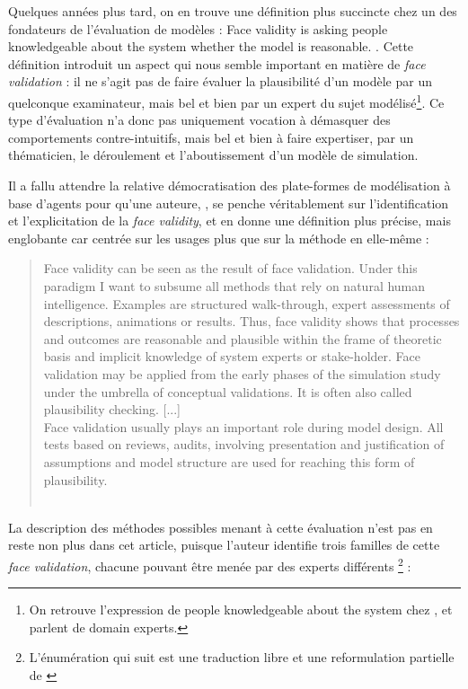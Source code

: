 Quelques années plus tard, on en trouve une définition plus succincte chez un des fondateurs de l'évaluation de modèles : \og Face validity is asking people knowledgeable about the system whether the model is reasonable.\fg{} \autocite[500]{sargent_validation_1979}.
Cette définition introduit un aspect qui nous semble important en matière de \textit{face validation} : il ne s'agit pas de faire évaluer la plausibilité d'un modèle par un quelconque examinateur, mais bel et bien par un expert du sujet modélisé\footnote{
	On retrouve l'expression de \og people knowledgeable about the system\fg{} chez \textcite[130]{balci_validation_1994}, et \textcite[2]{kennedy_verification_2006} parlent de \og domain experts\fg{}.
}.
Ce type d'évaluation n'a donc pas uniquement vocation à démasquer des comportements contre-intuitifs, mais bel et bien à faire expertiser, par un thématicien, le déroulement et l'aboutissement d'un modèle de simulation.

Il a fallu attendre la relative démocratisation des plate-formes de modélisation à base d'agents pour qu'une auteure, \citeauthor{klugl_validation_2008}, se penche véritablement sur l'identification et l'explicitation de la \textit{face validity}, et en donne une définition plus précise, mais englobante car centrée sur les usages plus que sur la méthode en elle-même :

\begin{quotation}
	\noindent \og
	Face validity can be seen as the result of face validation. Under this paradigm I want to subsume all methods that rely on natural human intelligence.
	Examples are structured walk-through, expert assessments of descriptions, animations or results.
	Thus, face validity shows that processes and outcomes are reasonable and plausible within the frame of theoretic basis and implicit knowledge of system experts or stake-holder.
	Face validation may be applied from the early phases of the simulation study under the umbrella of conceptual validations.
	It is often also called plausibility checking.
	[...]\\
	Face validation usually plays an important role during model design.
	All tests based on reviews, audits, involving presentation and justification of assumptions and model structure are used for reaching this form of plausibility.
	\fg{}\\
	\mbox{}~ \hfill \textcite[39--41]{klugl_validation_2008}
\end{quotation}


La description des méthodes possibles menant à cette évaluation n'est pas en reste non plus dans cet article, puisque l'auteur identifie trois familles de cette \textit{face validation}, chacune pouvant être menée par des experts différents \footnote{
	L'énumération qui suit est une traduction libre et une reformulation partielle de \textcite[41-42]{klugl_validation_2008}
} :

